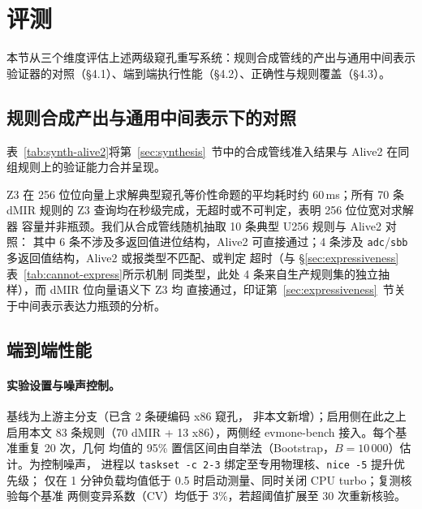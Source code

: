 \section{评测}
\label{sec:evaluation}

本节从三个维度评估上述两级窥孔重写系统：规则合成管线的产出与通用中间表示
验证器的对照（§4.1）、端到端执行性能（§4.2）、正确性与规则覆盖（§4.3）。

\subsection{规则合成产出与通用中间表示下的对照}

表~\ref{tab:synth-alive2}将第~\ref{sec:synthesis}~节中的合成管线准入结果与
Alive2 在同组规则上的验证能力合并呈现。



Z3 在 256 位位向量上求解典型窥孔等价性命题的平均耗时约 60\,ms；所有 70 条
dMIR 规则的 Z3 查询均在秒级完成，无超时或不可判定，表明 256 位位宽对求解器
容量并非瓶颈。我们从合成管线随机抽取 10 条典型 U256 规则与 Alive2 对照：
其中 6 条不涉及多返回值进位结构，Alive2 可直接通过；4 条涉及
\texttt{adc}/\texttt{sbb} 多返回值结构，Alive2 或报类型不匹配、或判定
超时（与 §\ref{sec:expressiveness} 表~\ref{tab:cannot-express}所示机制
同类型，此处 4 条来自生产规则集的独立抽样），而 dMIR 位向量语义下 Z3 均
直接通过，印证第~\ref{sec:expressiveness}~节关于中间表示表达力瓶颈的分析。

\subsection{端到端性能}

\paragraph{实验设置与噪声控制。}基线为上游主分支（已含 2 条硬编码 x86 窥孔，
非本文新增）；启用侧在此之上启用本文 83 条规则（70 dMIR + 13 x86），两侧经
evmone-bench 接入。每个基准重复 20 次，几何
均值的 95\% 置信区间由自举法（Bootstrap，$B = 10\,000$）估计。为控制噪声，
进程以 \texttt{taskset -c 2-3} 绑定至专用物理核、\texttt{nice -5} 提升优先级；
仅在 1 分钟负载均值低于 0.5 时启动测量、同时关闭 CPU turbo；复测核验每个基准
两侧变异系数（CV）均低于 3\%，若超阈值扩展至 30 次重新核验。





